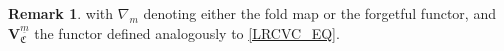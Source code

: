 \documentclass[a4paper,10pt
,draft
]{article}%
\numberwithin{equation}{section}
\numberwithin{figure}{section}
\theoremstyle{definition} %
\newtheorem{remark}[equation]{Remark}%
\newcommand{\F}{\ensuremath{\mathcal F}}
\newcommand{\V}{\ensuremath{\mathcal V}}
\newcommand{\1}{\ensuremath{\mathbbm 1}}%
\begin{document}
\begin{remark}
      with $\nabla_m$ denoting either the fold map or the forgetful functor,
      and $\boldsymbol{V}_{\mathfrak C}^{\underline{m}}$ the functor defined analogously to \eqref{LRCVC_EQ}.


\end{remark}
\end{document}
